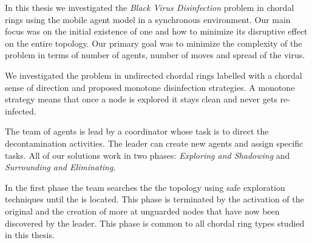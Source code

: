 









In this thesis we investigated the {\it  Black Virus Disinfection} problem in chordal rings using the mobile agent model in a synchronous environment. Our main focus was on the initial existence of one \bv and how to minimize its disruptive effect on the entire topology.  Our primary goal was to minimize the complexity of the problem in terms of number of agents, number of moves and spread of the virus.
 


We investigated the problem in undirected chordal rings labelled with a chordal sense of direction and proposed     monotone  disinfection strategies. A monotone strategy means that once a node is explored it stays clean and never gets re-infected.

The team of agents is lead by a coordinator whose task is to direct the decontamination activities. The leader can create new agents and assign specific tasks.
All of our solutions work in two phases: {\em Exploring and Shadowing} and {\em Surrounding and Eliminating}. 

In the first phase the team searches the the topology using safe exploration techniques until the \bv is located. This phase is terminated by the activation of the original \bv and the creation of more \bvs at unguarded nodes that have now been discovered by the leader. This phase is common to all chordal ring types studied in this thesis.


